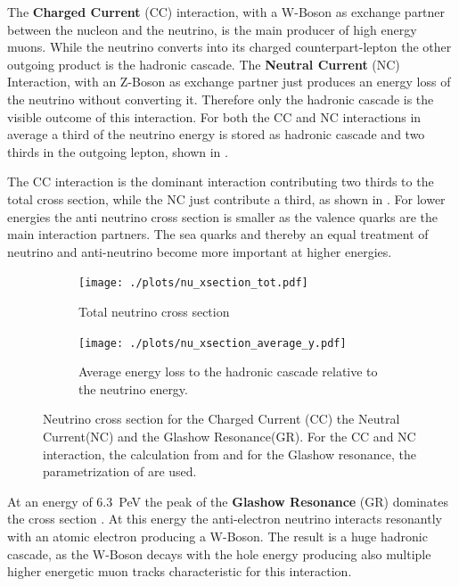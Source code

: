 The \textbf{Charged Current} (CC) interaction, with a W-Boson as exchange partner between the nucleon and the neutrino, is the main producer of high energy muons.
While the neutrino converts into its charged counterpart-lepton the other outgoing product is the hadronic cascade.
The \textbf{Neutral Current} (NC) Interaction, with an Z-Boson as exchange partner just produces an energy loss of the neutrino without converting it.
Therefore only the hadronic cascade is the visible outcome of this interaction.
For both the CC and NC interactions in average a third of the neutrino energy is stored as hadronic cascade and two thirds in the outgoing lepton, shown in .

The CC interaction is the dominant interaction contributing two thirds to the total cross section, while the NC just contribute a third, as shown in .
For lower energies the anti neutrino cross section is smaller as the valence quarks are the main interaction partners.
The sea quarks and thereby an equal treatment of neutrino and anti-neutrino become more important at higher energies.

\begin{figure}
    \centering
    \begin{subfigure}[t]{0.47\textwidth}
        \centering
        \texttt{[image: ./plots/nu\_xsection\_tot.pdf]}
        \caption{Total neutrino cross section}
        \label{fig:nu_xsection_tot}
    \end{subfigure}
    \hfill
    \begin{subfigure}[t]{0.47\textwidth}
        \centering
        \texttt{[image: ./plots/nu\_xsection\_average\_y.pdf]}
        \caption{Average energy loss to the hadronic cascade relative to the neutrino energy.}
        \label{fig:nu_xsection_y}
    \end{subfigure}
    \caption{Neutrino cross section for the Charged Current (CC) the Neutral Current(NC) and the Glashow Resonance(GR). For the CC and NC interaction, the calculation from \cite{CSMS11NuXsection} and for the Glashow resonance, the parametrization of \cite{Barger14} are used.}
    \label{fig:nu_xsection}
\end{figure}

At an energy of \SI{6.3}{PeV} the peak of the \textbf{Glashow Resonance} (GR) dominates the cross section \cite{Glashow60}.
At this energy the anti-electron neutrino interacts resonantly with an atomic electron producing a W-Boson.
The result is a huge hadronic cascade, as the W-Boson decays with the hole energy producing also multiple higher energetic muon tracks characteristic for this interaction.

